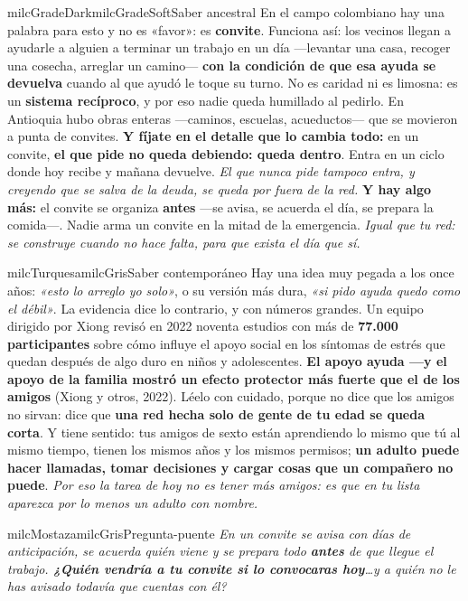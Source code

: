 \documentclass[11pt,letterpaper]{article}
\begin{document}
\begin{softbox}{milcGradeDark}{milcGradeSoft}{Saber ancestral}
En el campo colombiano hay una palabra para esto y no es «favor»: es \textbf{convite}. Funciona así: los vecinos llegan a ayudarle a alguien a terminar un trabajo en un día ---levantar una casa, recoger una cosecha, arreglar un camino--- \textbf{con la condición de que esa ayuda se devuelva} cuando al que ayudó le toque su turno. No es caridad ni es limosna: es un \textbf{sistema recíproco}, y por eso nadie queda humillado al pedirlo. En Antioquia hubo obras enteras ---caminos, escuelas, acueductos--- que se movieron a punta de convites. \textbf{Y fíjate en el detalle que lo cambia todo:} en un convite, \textbf{el que pide no queda debiendo: queda dentro}. Entra en un ciclo donde hoy recibe y mañana devuelve. \emph{El que nunca pide tampoco entra, y creyendo que se salva de la deuda, se queda por fuera de la red.} \textbf{Y hay algo más:} el convite se organiza \textbf{antes} ---se avisa, se acuerda el día, se prepara la comida---. Nadie arma un convite en la mitad de la emergencia. \emph{Igual que tu red: se construye cuando no hace falta, para que exista el día que sí.}
\end{softbox}

\begin{softbox}{milcTurquesa}{milcGris}{Saber contemporáneo}
Hay una idea muy pegada a los once años: \emph{«esto lo arreglo yo solo»}, o su versión más dura, \emph{«si pido ayuda quedo como el débil»}. La evidencia dice lo contrario, y con números grandes. Un equipo dirigido por Xiong revisó en 2022 noventa estudios con más de \textbf{77.000 participantes} sobre cómo influye el apoyo social en los síntomas de estrés que quedan después de algo duro en niños y adolescentes. \textbf{El apoyo ayuda ---y el apoyo de la familia mostró un efecto protector más fuerte que el de los amigos} (Xiong y otros, 2022). Léelo con cuidado, porque no dice que los amigos no sirvan: dice que \textbf{una red hecha solo de gente de tu edad se queda corta}. Y tiene sentido: tus amigos de sexto están aprendiendo lo mismo que tú al mismo tiempo, tienen los mismos años y los mismos permisos; \textbf{un adulto puede hacer llamadas, tomar decisiones y cargar cosas que un compañero no puede}. \emph{Por eso la tarea de hoy no es tener más amigos: es que en tu lista aparezca por lo menos un adulto con nombre.}
\end{softbox}

\begin{softbox}{milcMostaza}{milcGris}{Pregunta-puente}
\textit{En un convite se avisa con días de anticipación, se acuerda quién viene y se prepara todo \textbf{antes} de que llegue el trabajo. \textbf{¿Quién vendría a tu convite si lo convocaras hoy}\ldots y a quién no le has avisado todavía que cuentas con él?}
\end{softbox}
\end{document}
